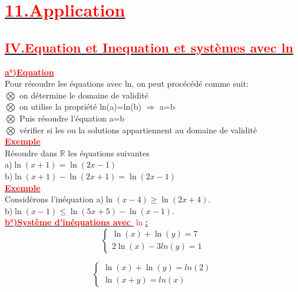 \documentclass[12pt,a4paper]{article}
\begin{document}
\section*{\underline{\textbf{\textcolor{red}{11.Application}}}}
\subsection*{\underline{\textbf{\textcolor{red}{IV.Equation et Inequation et systèmes avec ln}}}}
\underline{\textbf{\textcolor{red}{a°)Equation}}}\\
Pour résoudre les équations avec ln, on peut procécédé comme suit:\\
$\bigotimes$ on détermine le domaine de validité\\
$\bigotimes$ on utilise la propriété ln(a)=ln(b) $\Longrightarrow$ a=b \\
$\bigotimes$ Puis résoudre l'équation a=b\\
$\bigotimes$ vérifier si les ou la solutions appartiennent au domaine de validité\\
\underline{\textbf{\textcolor{red}{Exemple}}}\\
Résoudre dans $\mathbb{R}$ les équations suivantes\\
a)$\ln(x+1)=\ln(2x-1)$\\
b)$\ln(x+1)-\ln(2x+1)=\ln(2x-1)$\\
\underline{\textbf{\textcolor{red}{Exemple}}}\\
Considérons l'inéquation 
a)$\ln(x-4)\geq \ln(2x+4).$\\
b)$\ln(x-1)\leq \ln(5x+5)-\ln(x-1).$\\
\underline{\textbf{\textcolor{red}{b°)Système d'inéquations avec $\ln$:}}}\\
\[
\begin{cases}
\ln(x)+\ln(y) = 7 \\
2\ln(x)-3ln(y) = 1
\end{cases}
\]

\[
\begin{cases}
\ln(x)+\ln(y) = ln(2) \\
\ln(x+y) = ln(x)
\end{cases}
\]
\end{document}
